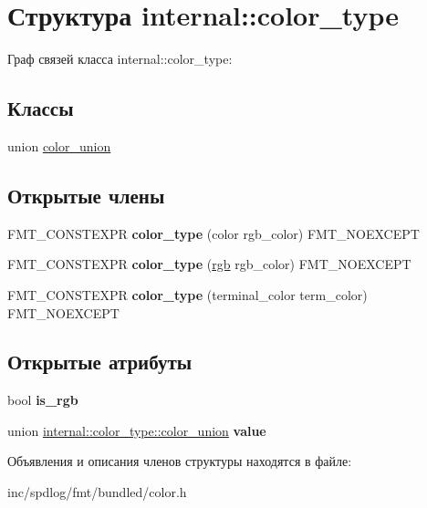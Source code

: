 \hypertarget{structinternal_1_1color__type}{}\section{Структура internal\+:\+:color\+\_\+type}
\label{structinternal_1_1color__type}


Граф связей класса internal\+:\+:color\+\_\+type\+:
\subsection*{Классы}
\begin{DoxyCompactItemize}
\item 
union \hyperlink{unioninternal_1_1color__type_1_1color__union}{color\+\_\+union}
\end{DoxyCompactItemize}
\subsection*{Открытые члены}
\begin{DoxyCompactItemize}
\item 
\mbox{\label{structinternal_1_1color__type_a8c0db95d7ceb5c1361978a7690492037}} 
F\+M\+T\+\_\+\+C\+O\+N\+S\+T\+E\+X\+PR {\bfseries color\+\_\+type} (color rgb\+\_\+color) F\+M\+T\+\_\+\+N\+O\+E\+X\+C\+E\+PT
\item 
\mbox{\label{structinternal_1_1color__type_ae44cd569407f2aa65168a7fa8234a3f2}} 
F\+M\+T\+\_\+\+C\+O\+N\+S\+T\+E\+X\+PR {\bfseries color\+\_\+type} (\hyperlink{structrgb}{rgb} rgb\+\_\+color) F\+M\+T\+\_\+\+N\+O\+E\+X\+C\+E\+PT
\item 
\mbox{\label{structinternal_1_1color__type_aa28b15cadf9646f33c7c25c2428befb9}} 
F\+M\+T\+\_\+\+C\+O\+N\+S\+T\+E\+X\+PR {\bfseries color\+\_\+type} (terminal\+\_\+color term\+\_\+color) F\+M\+T\+\_\+\+N\+O\+E\+X\+C\+E\+PT
\end{DoxyCompactItemize}
\subsection*{Открытые атрибуты}
\begin{DoxyCompactItemize}
\item 
\mbox{\label{structinternal_1_1color__type_ac4c20ebcaa52cafe86f90ba580183845}} 
bool {\bfseries is\+\_\+rgb}
\item 
\mbox{\label{structinternal_1_1color__type_ad7ac9b3ff11c9da97b0da326708ba530}} 
union \hyperlink{unioninternal_1_1color__type_1_1color__union}{internal\+::color\+\_\+type\+::color\+\_\+union} {\bfseries value}
\end{DoxyCompactItemize}


Объявления и описания членов структуры находятся в файле\+:\begin{DoxyCompactItemize}
\item 
inc/spdlog/fmt/bundled/color.\+h\end{DoxyCompactItemize}
